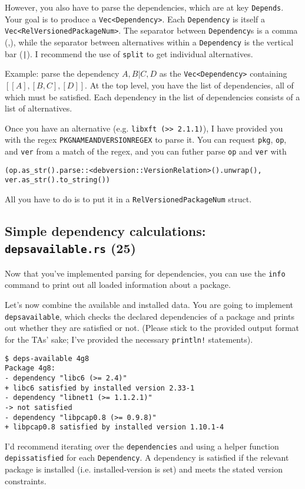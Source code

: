 \documentclass[12pt]{article}
\renewcommand{\_}{\kern-1.5pt\textunderscore\kern-1.5pt}
\begin{document}
\vspace{1em}
However, you also have to parse the dependencies, which are at key \texttt{Depends}. Your goal is to produce a \verb+Vec<Dependency>+.
Each \texttt{Dependency} is itself a \verb+Vec<RelVersionedPackageNum>+. The separator between
\texttt{Dependency}s is a comma (,), while the separator between alternatives within a \texttt{Dependency} is
the vertical bar (\texttt{|}). I recommend the use of \texttt{split} to get individual alternatives.\par

\vspace{1em}
Example: parse the dependency $A, B | C, D$ as the \verb+Vec<Dependency>+ containing $[[A], [B, C], [D]]$. At the top level, you have the list of dependencies, all of which must be satisfied. Each dependency in the list of dependencies consists of a list of alternatives.

\vspace{1em}
Once you have an alternative (e.g. \texttt{libxft (>> 2.1.1)}), I have provided you with the regex \texttt{PKGNAME\_AND\_VERSION\_REGEX} 
to parse it.
You can request \texttt{pkg}, \texttt{op}, and \texttt{ver} from a match of the regex, and you can futher parse \texttt{op}
and \texttt{ver} with
{\small
\begin{verbatim}
(op.as_str().parse::<debversion::VersionRelation>().unwrap(), ver.as_str().to_string())
\end{verbatim}
}
All you have to do is to put it in a \texttt{RelVersionedPackageNum} struct.

\subsection*{Simple dependency calculations: \texttt{deps\_available.rs} (25)}
Now that you've implemented parsing for dependencies, you can use the \texttt{info} command to print out all loaded
information about a package.\par

\vspace{1em}
Let's now combine the available and installed data. You are going to implement \texttt{deps\_available},
which checks the declared dependencies of a package and prints out whether they are satisfied or not.
(Please stick to the provided output format for the TAs' sake; I've provided the necessary \texttt{println!} 
statements).

\begin{verbatim}
$ deps-available 4g8
Package 4g8:
- dependency "libc6 (>= 2.4)"
+ libc6 satisfied by installed version 2.33-1
- dependency "libnet1 (>= 1.1.2.1)"
-> not satisfied
- dependency "libpcap0.8 (>= 0.9.8)"
+ libpcap0.8 satisfied by installed version 1.10.1-4
\end{verbatim}
I'd recommend iterating over the \texttt{dependencies} and using a helper function \texttt{dep\_is\_satisfied}
for each \texttt{Dependency}. A dependency is satisfied if the relevant package is installed (i.e. installed-version
is set) and meets the stated version constraints. 
\end{document}
